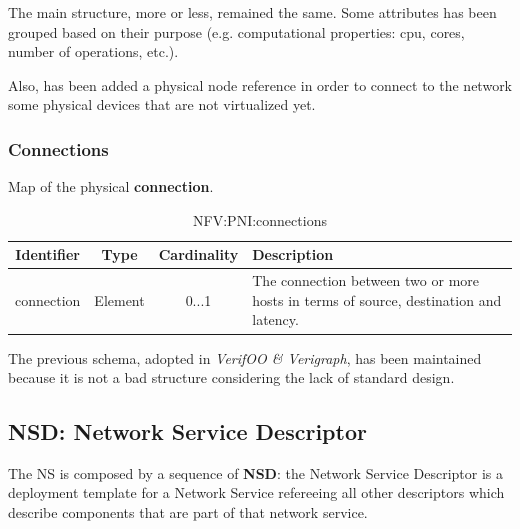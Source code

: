 \documentclass[11pt, english]{article}
\begin{document}
The main structure, more or less, remained the same. Some attributes has been grouped based on their purpose (e.g. computational properties: cpu, cores, number of operations, etc.). 

Also, has been added a physical node reference in order to connect to the network some physical devices that are not virtualized yet.

\subsubsection{Connections}
Map of the physical \textbf{connection}.

\begin{table}[ht]
    \centering
    \begin{tabular}{c|c|c|m{7cm}}
    \hline
    Identifier & Type & Cardinality & Description \\
    \hline
    \rowcolor{Gray}
    connection & Element & 0...1 & The connection between two or more hosts in terms of source, destination and latency. \\
    \hline
    \end{tabular}
    \caption{NFV:PNI:connections} \label{tab:tab5}
\end{table}

The previous schema, adopted in \emph{VerifOO \& Verigraph}, has been maintained  because it is not a bad structure considering the lack of standard design.

\subsection{NSD: Network Service Descriptor}
The NS is composed by a sequence of \textbf{NSD}: the Network Service Descriptor is a deployment template for a Network Service refereeing all other descriptors which describe components that are part of that network service.
\end{document}
